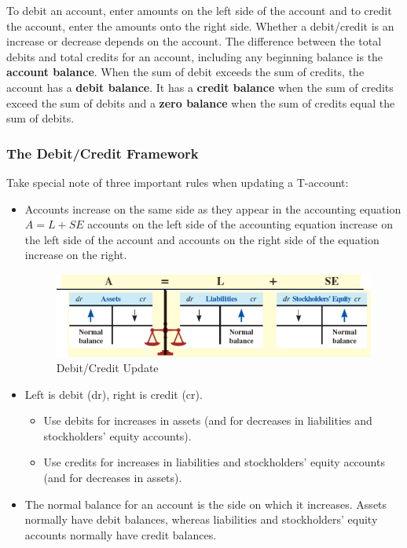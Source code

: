 \documentclass[../main.tex]{subfiles}
\begin{document}
	To debit an account, enter amounts on the left side of the account and to 
	credit the account, enter the amounts onto the right side. Whether a 
	debit/credit is an increase or decrease depends on the account. The 
	difference between the total debits and total credits for an account, 
	including any beginning balance is the \textbf{account balance}. When the 
	sum of debit exceeds the sum of credits, the account has a \textbf{debit 
	balance}. It has a \textbf{credit balance} when the sum of credits exceed 
	the sum of debits and a \textbf{zero balance} when the sum of credits equal 
	the sum of debits. 
	
	\subsubsection{The Debit/Credit Framework}
	
	Take special note of three important rules when updating a T-account:
	\begin{itemize}[noitemsep]
		\item Accounts increase on the same side as they appear in the 
		accounting equation $A = L + SE$ \ie accounts on the left side of the 
		accounting equation increase on the left side of the account and 
		accounts on the right side of the equation increase on the right.
		\begin{figure}[ht]
			\centering
			\includegraphics[width=1\columnwidth]{images/c2/debit_credit_framework.png}
			\caption{Debit/Credit Update}
		\end{figure}
		\item Left is debit (dr), right is credit (cr). 
		\begin{itemize}[noitemsep]
			\item Use debits for increases in assets (and for decreases in 
		liabilities and stockholders’ equity accounts). 
			\item Use credits for increases in liabilities and 
		stockholders’ equity accounts (and for decreases in assets).
		\end{itemize}
		\item The normal balance for an account is the side on which it 
		increases. Assets normally have debit balances, whereas liabilities and 
		stockholders’ equity accounts normally have credit balances.
	\end{itemize}
	
\end{document}
